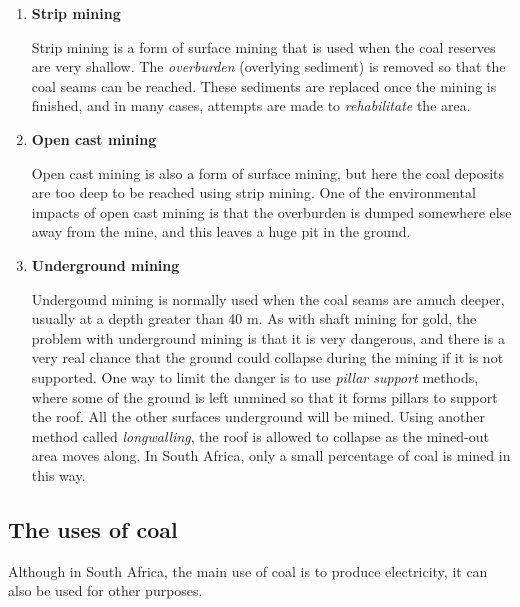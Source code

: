 \begin{enumerate}
\item{\textbf{Strip mining}

Strip mining is a form of surface mining that is used when the coal reserves are very shallow. The \textit{overburden} (overlying sediment) is removed so that the coal seams can be reached. These sediments are replaced once the mining is finished, and in many cases, attempts are made to \textit{rehabilitate} the area.
}

\item{\textbf{Open cast mining}

Open cast mining is also a form of surface mining, but here the coal deposits are too deep to be reached using strip mining. One of the environmental impacts of open cast mining is that the overburden is dumped somewhere else away from the mine, and this leaves a huge pit in the ground.
}

\item{\textbf{Underground mining}

Undergound mining is normally used when the coal seams are amuch deeper, usually at a depth greater than 40 m. As with shaft mining for gold, the problem with underground mining is that it is very dangerous, and there is a very real chance that the ground could collapse during the mining if it is not supported. One way to limit the danger is to use \textit{pillar support} methods, where some of the ground is left unmined so that it forms pillars to support the roof. All the other surfaces underground will be mined. Using another method called \textit{longwalling}, the roof is allowed to collapse as the mined-out area moves along. In South Africa, only a small percentage of coal is mined in this way.
}
\end{enumerate}

\subsection{The uses of coal}

Although in South Africa, the main use of coal is to produce electricity, it can also be used for other purposes.

